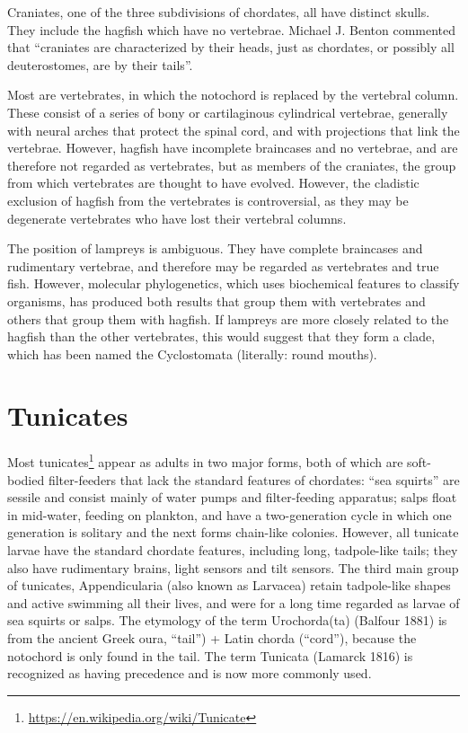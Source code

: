 \documentclass[]{book}
\let\rmarkdownfootnote\footnote%
\def\footnote{\protect\rmarkdownfootnote}
\renewcommand{\href}[2]{#2\footnote{\url{#1}}}
\theoremstyle{definition}
\theoremstyle{definition}
\theoremstyle{definition}
\theoremstyle{remark}
\begin{document}
Craniates, one of the three subdivisions of chordates, all have distinct
skulls. They include the hagfish which have no vertebrae. Michael J.
Benton commented that ``craniates are characterized by their heads, just
as chordates, or possibly all deuterostomes, are by their tails''.

Most are vertebrates, in which the notochord is replaced by the
vertebral column. These consist of a series of bony or cartilaginous
cylindrical vertebrae, generally with neural arches that protect the
spinal cord, and with projections that link the vertebrae. However,
hagfish have incomplete braincases and no vertebrae, and are therefore
not regarded as vertebrates, but as members of the craniates, the group
from which vertebrates are thought to have evolved. However, the
cladistic exclusion of hagfish from the vertebrates is controversial, as
they may be degenerate vertebrates who have lost their vertebral
columns.

The position of lampreys is ambiguous. They have complete braincases and
rudimentary vertebrae, and therefore may be regarded as vertebrates and
true fish. However, molecular phylogenetics, which uses biochemical
features to classify organisms, has produced both results that group
them with vertebrates and others that group them with hagfish. If
lampreys are more closely related to the hagfish than the other
vertebrates, this would suggest that they form a clade, which has been
named the Cyclostomata (literally: round mouths).

\section{Tunicates}\label{tunicates}

Most \href{https://en.wikipedia.org/wiki/Tunicate}{tunicates} appear as
adults in two major forms, both of which are soft-bodied filter-feeders
that lack the standard features of chordates: ``sea squirts'' are
sessile and consist mainly of water pumps and filter-feeding apparatus;
salps float in mid-water, feeding on plankton, and have a two-generation
cycle in which one generation is solitary and the next forms chain-like
colonies. However, all tunicate larvae have the standard chordate
features, including long, tadpole-like tails; they also have rudimentary
brains, light sensors and tilt sensors. The third main group of
tunicates, Appendicularia (also known as Larvacea) retain tadpole-like
shapes and active swimming all their lives, and were for a long time
regarded as larvae of sea squirts or salps. The etymology of the term
Urochorda(ta) (Balfour 1881) is from the ancient Greek oura, ``tail'') +
Latin chorda (``cord''), because the notochord is only found in the
tail. The term Tunicata (Lamarck 1816) is recognized as having
precedence and is now more commonly used.
\end{document}
